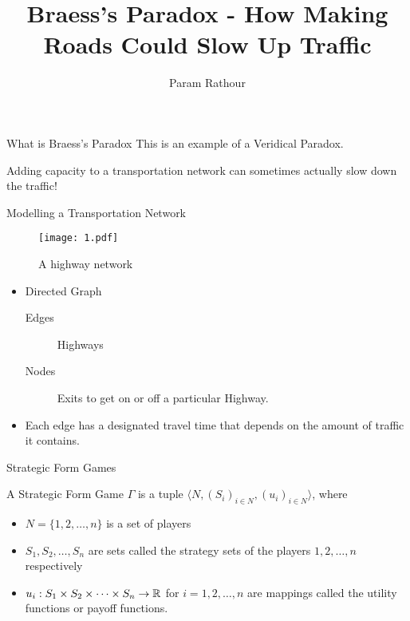 \documentclass[10pt]{beamer}  %
\title{\normalsize{Braess's Paradox - How Making Roads Could Slow Up Traffic}} %
\subtitle{\normalsize{Param Rathour}} %
\begin{document}
\frame{\titlepage} %

\setlength{\abovedisplayskip}{0pt}
\setlength{\belowdisplayskip}{0pt}
\setlength{\abovedisplayshortskip}{0pt}
\setlength{\belowdisplayshortskip}{0pt}  %

\begin{frame}{What is Braess's Paradox}   %
    This is an example of a Veridical Paradox.

    Adding capacity to a transportation network can sometimes actually slow down the traffic!
\end{frame}

\begin{frame}{Modelling a Transportation Network}   %
    \begin{figure}
        \centering
        \texttt{[image: 1.pdf]}
        \caption{A highway network}
    \end{figure}
    \begin{itemize}
        \item Directed Graph 
        \begin{description}
            \item[Edges] Highways
            \item[Nodes] Exits to get on or off a particular Highway.
        \end{description}
        \item Each edge has a designated travel time that depends on the amount of traffic it contains.
    \end{itemize}
\end{frame}

\begin{frame}{Strategic Form Games}   %
    \begin{definition}
        A Strategic Form Game $\Gamma$ is a tuple $\langle N,(S_i)_{i\in N},(u_i)_{i\in N}\rangle$, where
        \begin{itemize}
            \item $N=\{1,2,\ldots,n\}$ is a set of players
            \item $S_1,S_2,\ldots,S_n$ are sets called the strategy sets of the players $1,2,\ldots,n$ respectively
            \item $u_i : S_1 \times S_2 \times \cdots \times S_n \rightarrow \mathbb{R}$ for $i = 1, 2,\ldots, n$ are mappings called the utility functions or payoff functions.
        \end{itemize}
    \end{definition}
\end{frame}
\end{document}
